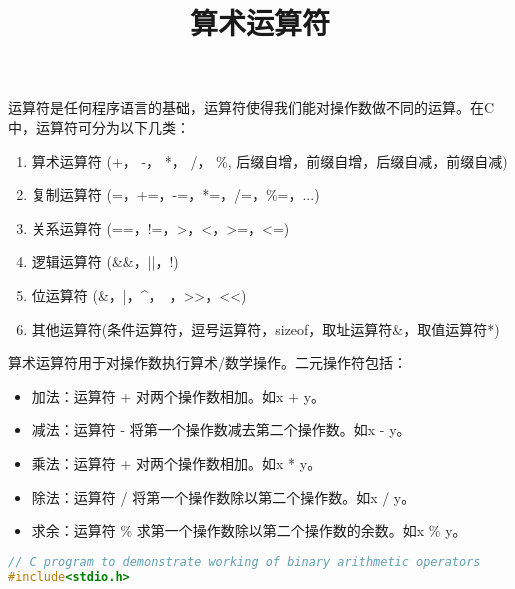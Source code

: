 \documentclass[10pt,a4paper%
tablecaptionabove]{article}
\def\tf{\ttfamily}
\begin{document}
\begin{CJK}{UTF8}{gkai}
 

\newtheorem{li}{例}
\newtheorem{jielun}{结论}
\newtheorem{dingli}{定理}
\newtheorem{mingti}{{命题}} 
\newtheorem{yinli}{{引理}} 
\newtheorem{tuilun}{{推论}}
\newtheorem{dingyi}{{定义}} 
\newtheorem{example}{{例}}
\newtheorem*{example*}{{例}}
\newtheorem*{jie}{{解}}
\newtheorem*{zhengming}{{证明}}
\newtheorem{zhu}{{注}}
\newtheorem*{zhu*}{{注}}
\newtheorem{xingzhi}{{性质}}
\newtheorem{wenti}{{问题}}
\newtheorem{rem}{{Remark}}
\newtheorem{lem}{{Lemma}}
\pagestyle{plain}


\title{算术运算符}
\maketitle

运算符是任何程序语言的基础，运算符使得我们能对操作数做不同的运算。在C中，运算符可分为以下几类：
\begin{enumerate}
\item 算术运算符{ \tf (+， -， *， /， \%, 后缀自增，前缀自增，后缀自减，前缀自减)}
\item 复制运算符{ \tf (=，+=，-=，*=，/=，\%=，...)}
\item 关系运算符{ \tf (==，!=，>，<，>=，<=)}
\item 逻辑运算符{ \tf (\&\&，||，!)}
\item 位运算符{ \tf (\&，|，\^{}，~，>>，<<)}
\item 其他运算符{\tf (条件运算符，逗号运算符，sizeof，取址运算符\&，取值运算符*)}
\end{enumerate}
算术运算符用于对操作数执行算术/数学操作。二元操作符包括：
\begin{itemize}
\item 加法：运算符 {\tf +} 对两个操作数相加。如{\tf x + y}。
\item 减法：运算符 {\tf -} 将第一个操作数减去第二个操作数。如{\tf x - y}。
\item 乘法：运算符 {\tf +} 对两个操作数相加。如{\tf x * y}。
\item 除法：运算符 {\tf /} 将第一个操作数除以第二个操作数。如{\tf x / y}。
\item 求余：运算符 {\tf \%} 求第一个操作数除以第二个操作数的余数。如{\tf x \% y}。
\end{itemize}
\begin{lstlisting}[language=c,backgroundcolor=\color{red!10}]
// C program to demonstrate working of binary arithmetic operators
#include<stdio.h>
 

\end{lstlisting}
\end{CJK}
\end{document}
